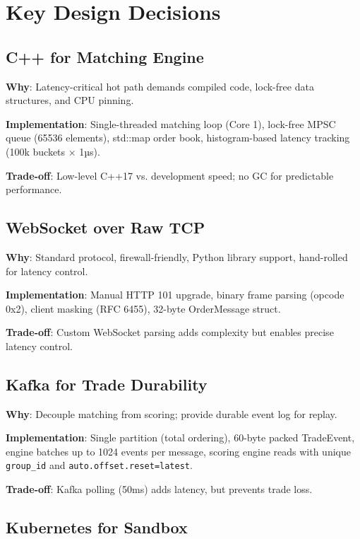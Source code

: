 \documentclass[10pt,a4paper,oneside]{report}
\begin{document}
\chapter{Key Design Decisions}

\section{C++ for Matching Engine}

\textbf{Why}: Latency-critical hot path demands compiled code, lock-free data structures, and CPU pinning.

\textbf{Implementation}: Single-threaded matching loop (Core 1), lock-free MPSC queue (65536 elements), std::map order book, histogram-based latency tracking (100k buckets × 1µs).

\textbf{Trade-off}: Low-level C++17 vs. development speed; no GC for predictable performance.

\section{WebSocket over Raw TCP}

\textbf{Why}: Standard protocol, firewall-friendly, Python library support, hand-rolled for latency control.

\textbf{Implementation}: Manual HTTP 101 upgrade, binary frame parsing (opcode 0x2), client masking (RFC 6455), 32-byte OrderMessage struct.

\textbf{Trade-off}: Custom WebSocket parsing adds complexity but enables precise latency control.

\section{Kafka for Trade Durability}

\textbf{Why}: Decouple matching from scoring; provide durable event log for replay.

\textbf{Implementation}: Single partition (total ordering), 60-byte packed TradeEvent, engine batches up to 1024 events per message, scoring engine reads with unique \texttt{group\_id} and \texttt{auto.offset.reset=latest}.

\textbf{Trade-off}: Kafka polling (50ms) adds latency, but prevents trade loss.

\section{Kubernetes for Sandbox}
\end{document}
